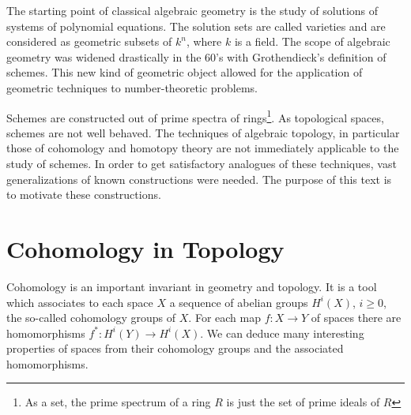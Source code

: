 

The starting point of classical algebraic geometry is the study of solutions of systems of polynomial equations. The solution sets are called varieties and are considered as geometric subsets of $k^n$, where $k$ is a field. The scope of algebraic geometry was widened drastically in the 60's with Grothendieck's definition of schemes. This new kind of geometric object allowed for the application of geometric techniques to number-theoretic problems. 

Schemes are constructed out of prime spectra of rings\footnote{As a set, the prime spectrum of a ring $R$ is just the set of prime ideals of $R$}. As topological spaces, schemes are not well behaved. The techniques of algebraic topology, in particular those of cohomology and homotopy theory are not immediately applicable to the study of schemes. In order to get satisfactory analogues of these techniques, vast generalizations of known constructions were needed. The purpose of this text is to motivate these constructions.

\section{Cohomology in Topology}
Cohomology is an important invariant in geometry and topology. It is a tool which associates to each space $X$ a sequence of abelian groups $H^i(X)$, $i \ge 0$, the so-called cohomology groups of $X$. For each map $f: X \to Y$ of spaces there are homomorphisms $f^*: H^i(Y) \to H^i(X)$. We can deduce many interesting properties of spaces from their cohomology groups and the associated homomorphisms.

